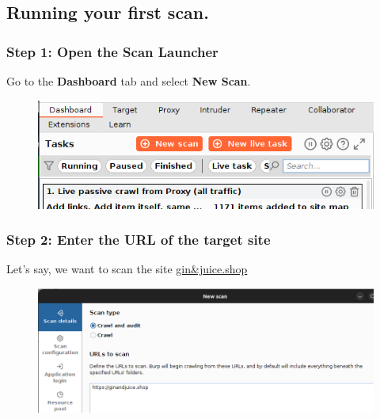 \documentclass[
	a4paper, %
	12pt, %
]{CSSullivanBusinessReport}
\begin{document}
\subsection*{Running your first scan.}
\subsubsection*{Step 1: Open the Scan Launcher}
\begin{fullwidth}
Go to the {\color{orange}\textbf{Dashboard}} tab and select  {\color{orange}\textbf{New Scan}}.
\begin{figure}[H]
    \centering
    \includegraphics[width=1\linewidth]{Images//using scanner/dashboard_newScan.png}

\end{figure}
\end{fullwidth}

\subsubsection*{Step 2: Enter the URL of the target site}
\begin{fullwidth}
Let’s say, we want to scan the site \href{https://ginandjuice.shop}{\color{orange}gin\&juice.shop}
\begin{figure}[H]
    \centering
    \includegraphics[width=1\linewidth]{Images//using scanner/setting_site.png}

\end{figure}

\end{fullwidth}
\end{document}

